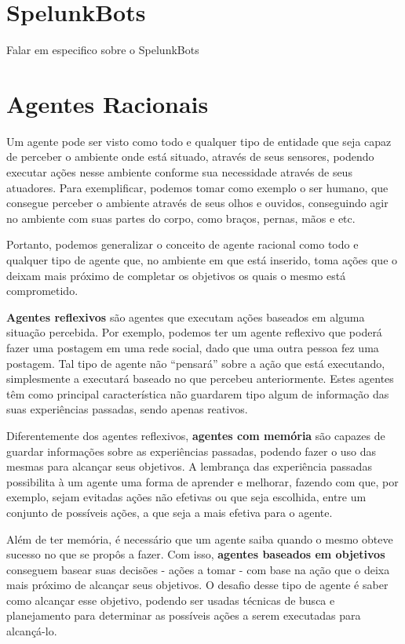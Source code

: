 \section{SpelunkBots}
Falar em especifico sobre o SpelunkBots



\section{Agentes Racionais}
Um agente pode ser visto como todo e qualquer tipo de entidade que seja capaz
de perceber o ambiente onde está situado, através de seus sensores, podendo
executar ações nesse ambiente conforme sua necessidade através de seus
atuadores.\cite{Russell:1995:AIM:193191} Para exemplificar, podemos tomar como
exemplo o ser humano, que consegue perceber o ambiente através de seus olhos e
ouvidos, conseguindo agir no ambiente com suas partes do corpo, como braços,
pernas, mãos e etc.\cite{Russell:1995:AIM:193191}

Portanto, podemos generalizar o conceito de agente racional como todo e
qualquer tipo de agente que, no ambiente em que está inserido, toma ações que o
deixam mais próximo de completar os objetivos os quais o mesmo está
comprometido.

\textbf{Agentes reflexivos} são agentes que executam ações baseados em alguma
situação percebida. Por exemplo, podemos ter um agente reflexivo que poderá
fazer uma postagem em uma rede social, dado que uma outra pessoa fez uma
postagem. Tal tipo de agente não ``pensará'' sobre a ação que está executando,
simplesmente a executará baseado no que percebeu anteriormente. Estes agentes
têm como principal característica não guardarem tipo algum de informação das
suas experiências passadas, sendo apenas reativos.

Diferentemente dos agentes reflexivos, \textbf{agentes com memória} são capazes
de guardar informações sobre as experiências passadas, podendo fazer o uso das
mesmas para alcançar seus objetivos. A lembrança das experiência passadas
possibilita à um agente uma forma de aprender e melhorar, fazendo com que, por
exemplo, sejam evitadas ações não efetivas ou que seja escolhida, entre um
conjunto de possíveis ações, a que seja a mais efetiva para o agente.

Além de ter memória, é necessário que um agente saiba quando o mesmo obteve
sucesso no que se propôs a fazer. Com isso, \textbf{agentes baseados em
objetivos} conseguem basear suas decisões - ações a tomar - com base na ação
que o deixa mais próximo de alcançar seus objetivos. O desafio desse tipo de
agente é saber como alcançar esse objetivo, podendo ser usadas técnicas de
busca e planejamento para determinar as possíveis ações a serem executadas para
alcançá-lo.

